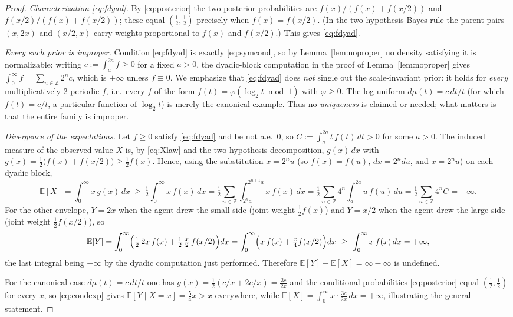\documentclass{amsart}
\theoremstyle{plain}
\theoremstyle{definition}
\begin{document}
\begin{proof}
\emph{Characterization \eqref{eq:fdyad}.} By \eqref{eq:posterior} the two
posterior probabilities are $f(x)/(f(x)+f(x/2))$ and $f(x/2)/(f(x)+f(x/2))$;
these equal $(\tfrac12,\tfrac12)$ precisely when $f(x)=f(x/2)$. (In the
two-hypothesis Bayes rule the parent pairs $(x,2x)$ and $(x/2,x)$ carry weights
proportional to $f(x)$ and $f(x/2)$.) This gives \eqref{eq:fdyad}.

\emph{Every such prior is improper.} Condition \eqref{eq:fdyad} is exactly
\eqref{eq:symcond}, so by Lemma~\ref{lem:noproper} no density satisfying it is
normalizable: writing $c:=\int_a^{2a}f\ge 0$ for a fixed $a>0$, the dyadic-block
computation in the proof of Lemma~\ref{lem:noproper} gives
$\int_0^\infty f=\sum_{n\in\mathbb Z}2^{n}c$, which is $+\infty$ unless $f\equiv0$.
We emphasize that \eqref{eq:fdyad} does \emph{not} single out the scale-invariant
prior: it holds for \emph{every} multiplicatively $2$-periodic $f$, i.e.\ every
$f$ of the form $f(t)=\varphi(\log_2 t\bmod 1)$ with $\varphi\ge 0$. The
log-uniform $d\mu(t)=c\,dt/t$ (for which $f(t)=c/t$, a particular function of
$\log_2 t$) is merely the canonical example. Thus no \emph{uniqueness} is
claimed or needed; what matters is that the entire family is improper.

\emph{Divergence of the expectations.} Let $f\ge 0$ satisfy \eqref{eq:fdyad} and
be not a.e.\ $0$, so $C:=\int_a^{2a} t\,f(t)\,dt>0$ for some $a>0$. The induced
measure of the observed value $X$ is, by \eqref{eq:Xlaw} and the two-hypothesis
decomposition, $g(x)\,dx$ with $g(x)=\tfrac12\bigl(f(x)+f(x/2)\bigr)\ge\tfrac12 f(x)$.
Hence, using the substitution $x=2^{n}u$ (so $f(x)=f(u)$, $dx=2^{n}du$, and
$x=2^{n}u$) on each dyadic block,
\[
\mathbb E[X]=\int_0^\infty x\,g(x)\,dx\ \ge\ \tfrac12\int_0^\infty x\,f(x)\,dx
=\tfrac12\sum_{n\in\mathbb Z}\int_{2^{n}a}^{2^{n+1}a} x\,f(x)\,dx
=\tfrac12\sum_{n\in\mathbb Z} 4^{n}\!\int_a^{2a}\! u\,f(u)\,du
=\tfrac12\sum_{n\in\mathbb Z}4^{n}C=+\infty .
\]
For the other envelope, $Y=2x$ when the agent drew the small side (joint
weight $\tfrac12 f(x)$) and $Y=x/2$ when the agent drew the large side (joint
weight $\tfrac12 f(x/2)$), so
\[
\mathbb E[Y]=\int_0^\infty\Bigl(\tfrac12\,2x\,f(x)+\tfrac12\,\tfrac x2\,f(x/2)\Bigr)dx
=\int_0^\infty\Bigl(x\,f(x)+\tfrac x4 f(x/2)\Bigr)dx
\ \ge\ \int_0^\infty x\,f(x)\,dx=+\infty ,
\]
the last integral being $+\infty$ by the dyadic computation just performed.
Therefore $\mathbb E[Y]-\mathbb E[X]=\infty-\infty$
is undefined.

For the canonical case $d\mu(t)=c\,dt/t$ one has $g(x)=\tfrac12(c/x+2c/x)=\tfrac{3c}{2x}$
and the conditional probabilities \eqref{eq:posterior} equal $(\tfrac12,\tfrac12)$
for every $x$, so \eqref{eq:condexp} gives $\mathbb E[Y\mid X=x]=\tfrac54x>x$
everywhere, while $\mathbb E[X]=\int_0^\infty x\cdot\tfrac{3c}{2x}\,dx=+\infty$,
illustrating the general statement.
\end{proof}
\end{document}
